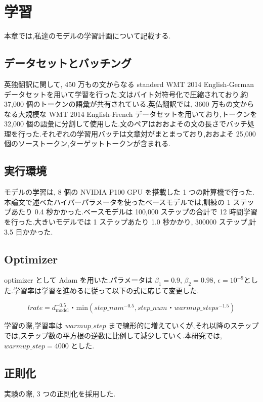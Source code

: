 \documentclass{jarticle}     %
\begin{document}
\section{学習}
本章では,私達のモデルの学習計画について記載する.

\subsection{データセットとバッチング}
英独翻訳に関して, 450 万もの文からなる standerd WMT 2014 English-German データセットを用いて学習を行った.文はバイト対符号化\cite{3}で圧縮されており,約 37,000 個のトークンの語彙が共有されている.英仏翻訳では, 3600 万もの文からなる大規模な WMT 2014 English-French データセットを用いており,トークンを 32,000 個の語彙に分割して使用した\cite{31}.文のペアはおおよその文の長さでバッチ処理を行った.それぞれの学習用バッチは文章対がまとまっており,おおよそ 25,000 個のソーストークン,ターゲットトークンが含まれる.

\subsection{実行環境}
モデルの学習は, 8 個の NVIDIA P100 GPU を搭載した 1 つの計算機で行った.
本論文で述べたハイパーパラメータを使ったベースモデルでは,訓練の 1 ステップあたり 0.4 秒かかった.ベースモデルは 100,000 ステップの合計で 12 時間学習を行った.大きいモデルでは 1 ステップあたり 1.0 秒かかり, 300000 ステップ,計 3.5 日かかった.

\subsection{Optimizer}
optimizer として Adam\cite{17} を用いた.パラメータは $\beta_\mathrm{1} = 0.9$, $\beta_\mathrm{2} = 0.98$, $\epsilon = 10^{-9}$とした.学習率は学習を進めるに従って以下の式に応じて変更した.

\begin{equation}
  lrate = d_\mathrm{model}^{-0.5}・\mathrm{min}(step\_num^{-0.5},step\_num・warmup\_steps^{-1.5})
\end{equation}

学習の際,学習率は $warmup\_step$ まで線形的に増えていくが,それ以降のステップでは,ステップ数の平方根の逆数に比例して減少していく.本研究では, $warmup\_step = 4000$ とした. 

\subsection{正則化}
実験の際, 3 つの正則化を採用した.
\end{document}
